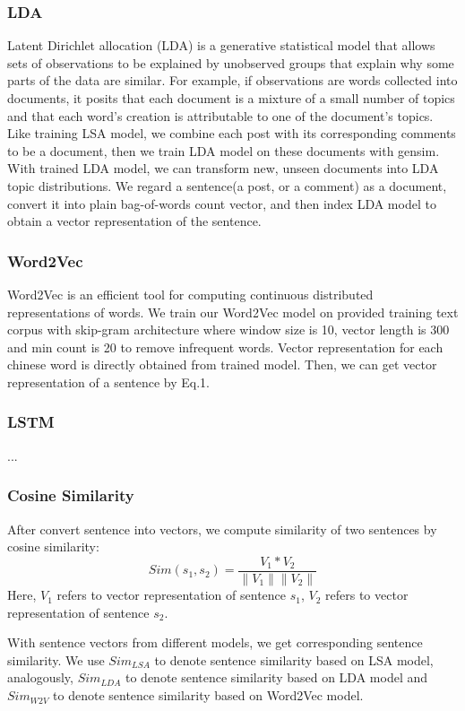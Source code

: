 \documentclass{llncs}
\begin{document}
\subsubsection{LDA}
Latent Dirichlet allocation (LDA) is a generative statistical model that allows sets of observations to be explained by unobserved groups that explain why some parts of the data are similar. For example, if observations are words collected into documents, it posits that each document is a mixture of a small number of topics and that each word's creation is attributable to one of the document's topics. Like training LSA model, we combine each post with its corresponding comments to be a document, then we train LDA model on these documents with gensim. With trained LDA model, we can transform new, unseen documents into LDA topic distributions. We regard a sentence(a post, or a comment) as a document, convert it into plain bag-of-words count vector, and then index LDA model to obtain a vector representation of the sentence. 

\subsubsection{Word2Vec}
Word2Vec is an efficient tool for computing continuous distributed 
representations of words. We train our Word2Vec model on provided training 
text corpus with skip-gram architecture where window size is 10, vector 
length is 300 and min count is 20 to remove infrequent words. Vector 
representation for each chinese word is directly obtained from trained model. 
Then, we can get vector representation of a sentence by Eq.1.

\subsubsection{LSTM}
...

\subsubsection{Cosine Similarity} 
After convert sentence into vectors, we compute similarity of two sentences by cosine similarity:
\begin{equation}
   Sim(s_1, s_2) = \frac{V_1 * V_2}{\left \| V_1 \right \| \left \| V_2 \right \|}
\end{equation}
Here, $V_1$ refers to vector representation of sentence $s_1$, $V_2$ refers to vector representation of sentence $s_2$.

With sentence vectors from different models, we get corresponding sentence similarity. We use $Sim_{LSA}$ to denote sentence similarity based on LSA model, analogously, $Sim_{LDA}$ to denote sentence similarity based on LDA model and $Sim_{W2V}$ to denote sentence similarity based on Word2Vec model.
\end{document}
